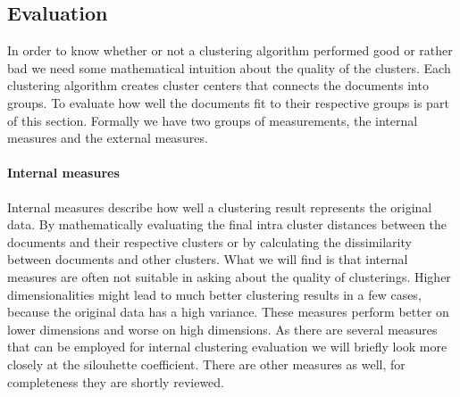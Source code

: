  \subsection{Evaluation}
    In order to know whether or not a clustering algorithm performed good or rather bad we need some mathematical intuition about the quality of the clusters. Each clustering algorithm creates cluster centers that connects the documents into groups. To evaluate how well the documents fit to their respective groups is part of this section.
    Formally we have two groups of measurements, the internal measures and the external measures. \cite{Nothing}

    \paragraph{Internal measures}
      Internal measures describe how well a clustering result represents the original data. By mathematically evaluating the final intra cluster distances between the documents and their respective clusters or by calculating the dissimilarity between documents and other clusters. What we will find is that internal measures are often not suitable in asking about the quality of clusterings. Higher dimensionalities might lead to much better clustering results in a few cases, because the original data has a high variance. These measures perform better on lower dimensions and worse on high dimensions. As there are several measures that can be employed for internal clustering evaluation we will briefly look more closely at the silouhette coefficient. There are other measures as well, for completeness they are shortly reviewed.

